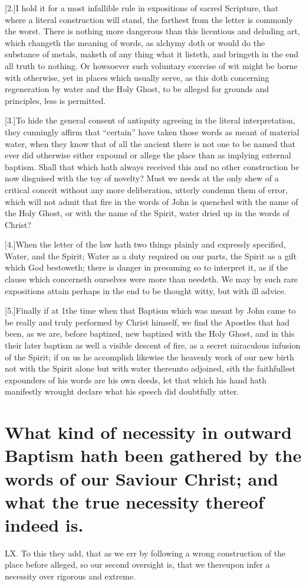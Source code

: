[2.]I hold it for a most infallible rule in expositions of sacred Scripture, that where a literal construction will stand, the farthest from the letter is commonly the worst. There is nothing more dangerous than this licentious and deluding art, which changeth the meaning of words, as alchymy doth or would do the substance of metals, maketh of any thing what it listeth, and bringeth in the end all truth to nothing. Or howsoever such voluntary exercise of wit might be borne with otherwise, yet in places which usually serve, as this doth concerning regeneration by water and the Holy Ghost, to be alleged for grounds and principles, less is permitted.

[3.]To hide the general consent of antiquity agreeing in the literal interpretation, they cunningly affirm that “certain” have taken those words as meant of material water, when they know that of all the ancient there is not one to be named that ever did otherwise either expound or allege the place than as implying external baptism. Shall that which hath always received this and no other construction be now disguised with the toy of novelty? Must we needs at the only shew of a critical conceit without any more deliberation, utterly condemn them of error, which will not admit that fire in the words of John is quenched with the name of the Holy Ghost, or with the name of the Spirit, water dried up in the words of Christ?

[4.]When the letter of the law hath two things plainly and expressly specified, Water, and the Spirit; Water as a duty  required on our parts, the Spirit as a gift which God bestoweth; there is danger in presuming so to interpret it, as if the clause which concerneth ourselves were more than needeth.
 We may by such rare expositions attain perhaps in the end to be thought witty, but with ill advice.

[5.]Finally if at 1the time when that Baptism which was meant by John came to be really and truly performed by Christ himself, we find the Apostles that had been, as we are, before baptized, new baptized with the Holy Ghost, and in this their later baptism as well a visible descent of fire, as a secret miraculous infusion of the Spirit; if on us he accomplish likewise the heavenly work of our new birth not with the Spirit alone but with water thereunto adjoined, sith the faithfullest expounders of his words are his own deeds, let that which his hand hath manifestly wrought declare what his speech did doubtfully utter.


\section*{What kind of necessity in outward Baptism hath been gathered by the words of our Saviour Christ; and what the true necessity thereof indeed is.}
LX. To this they add, that as we err by following a wrong construction of the place before alleged, so our second oversight is, that we thereupon infer a necessity over rigorous and extreme.

